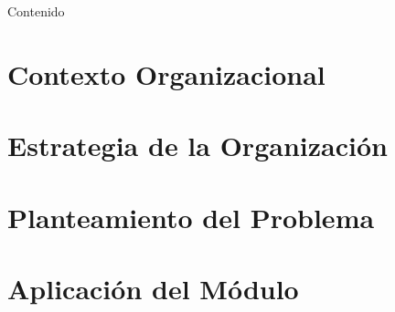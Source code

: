 \documentclass[11pt, aspectratio=169]{beamer}
\begin{document}
\begin{frame}[plain]
    \titlepage
\end{frame}

\begin{frame}{Contenido}
    \tableofcontents
\end{frame}


\section{Contexto Organizacional}


\section{Estrategia de la Organización}


\section{Planteamiento del Problema}


\section{Aplicación del Módulo}

\end{document}
